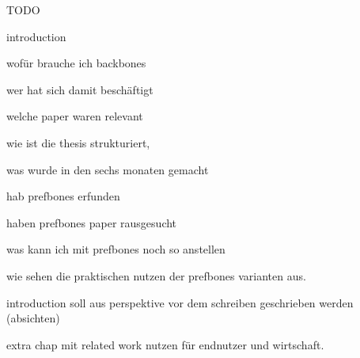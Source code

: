TODO

introduction

wofür brauche ich backbones

wer hat sich damit beschäftigt

welche paper waren relevant

wie ist die thesis strukturiert, 

was wurde in den sechs monaten gemacht





hab prefbones erfunden

haben prefbones paper rausgesucht

was kann ich mit prefbones noch so anstellen

wie sehen die praktischen nutzen der prefbones varianten aus.



introduction soll aus perspektive vor dem schreiben geschrieben werden (absichten)

extra chap mit related work
nutzen für endnutzer und wirtschaft.
